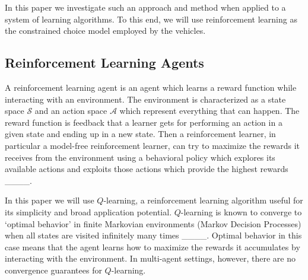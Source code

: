 
In this paper we investigate such an approach and method when applied to a system of learning algorithms. To this end, we will use reinforcement learning as the constrained choice model employed by the vehicles.


\subsection{Reinforcement Learning Agents}
\label{sec:stateless}
A reinforcement learning agent is an agent which learns a reward function while interacting with an environment. The environment is characterized as a state space $\mathcal{S}$ and an action space $\mathcal{A}$ which represent everything that can happen. The reward function is feedback that a learner gets for performing an action in a given state and ending up in a new state. Then a reinforcement learner, in particular a model-free reinforcement learner, can try to maximize the rewards it receives from the environment using a behavioral policy which explores its available actions and exploits those actions which provide the highest rewards ____.

In this paper we will use $Q$-learning, a reinforcement learning algorithm useful for its simplicity and broad application potential. $Q$-learning is known to converge to `optimal behavior' in finite Markovian environments (Markov Decision Processes) when all states are visited infinitely many times ____. Optimal behavior in this case means that the agent learns how to maximize the rewards it accumulates by interacting with the environment. In multi-agent settings, however, there are no convergence guarantees for $Q$-learning.

